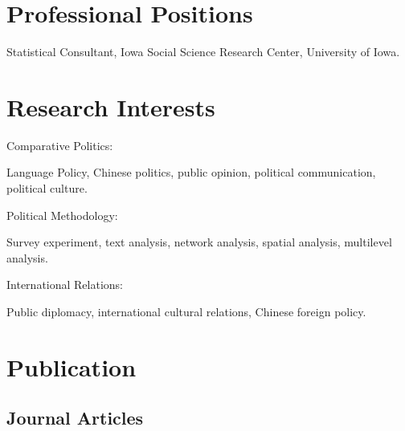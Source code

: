 \documentclass[10.5pt,]{article}
\providecommand{\tightlist}{%
  \setlength{\itemsep}{0pt}\setlength{\parskip}{0pt}}
\renewenvironment{itemize}{
  \begin{list}{}{
    \setlength{\leftmargin}{1.5em}
  }
}{
  \end{list}
}
\begin{document}
\section{Professional Positions}\label{professional-positions}

\begin{itemize}
\tightlist
\item
  Statistical Consultant, Iowa Social Science Research Center,
  University of Iowa.
\end{itemize}

\section{Research Interests}\label{research-interests}

\begin{itemize}
\tightlist
\item
  Comparative Politics:

  \begin{itemize}
  \tightlist
  \item
    Language Policy, Chinese politics, public opinion, political
    communication, political culture.
  \end{itemize}
\item
  Political Methodology:

  \begin{itemize}
  \tightlist
  \item
    Survey experiment, text analysis, network analysis, spatial
    analysis, multilevel analysis.
  \end{itemize}
\item
  International Relations:

  \begin{itemize}
  \tightlist
  \item
    Public diplomacy, international cultural relations, Chinese foreign
    policy.
  \end{itemize}
\end{itemize}

\section{Publication}\label{publication}

\subsection{Journal Articles}\label{journal-articles}
\end{document}
